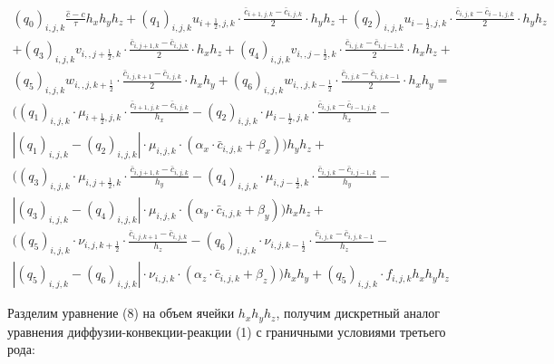 \documentclass[12pt]{article}
\begin{document}
\begin{multline} 
	(q_0)_{i,j,k}\frac{\hat{c}-c}{\tau}h_xh_yh_z + (q_1)_{i,j,k}u_{i+\frac{1}{2},j,k} \cdot\frac{\bar{c}_{i+1,j,k}-\bar{c}_{i,j,k}}{2}\cdot h_yh_z + (q_2)_{i,j,k}u_{i-\frac{1}{2},j,k}\cdot\frac{\bar{c}_{i,j,k}-\bar{c}_{i-1,j,k}}{2}\cdot h_yh_z \\
	+ (q_3)_{i,j,k}v_{i,,j+\frac{1}{2},k}\cdot\frac{\bar{c}_{i,j+1,k}-\bar{c}_{i,j,k}}{2}\cdot h_xh_z + 
	(q_4)_{i,j,k}v_{i,,j-\frac{1}{2},k}\cdot\frac{\bar{c}_{i,j,k}-\bar{c}_{i,j-1,k}}{2}\cdot h_xh_z + \\
	(q_5)_{i,j,k}w_{i,,j,k+\frac{1}{2}}\cdot\frac{\bar{c}_{i,j,k+1}-\bar{c}_{i,j,k}}{2}\cdot h_xh_y + 
	(q_6)_{i,j,k}w_{i,,j,k-\frac{1}{2}}\cdot\frac{\bar{c}_{i,j,k}-\bar{c}_{i,j,k-1}}{2}\cdot h_xh_y = \\
	((q_1)_{i,j,k}\cdot\mu_{i+\frac{1}{2},j,k}\cdot \frac{\bar{c}_{i+1,j,k}-\bar{c}_{i,j,k}}{h_x} -  (q_2)_{i,j,k}\cdot\mu_{i-\frac{1}{2},j,k}\cdot \frac{\bar{c}_{i,j,k}-\bar{c}_{i-1,j,k}}{h_x} - \\
	 |(q_1)_{i,j,k}-(q_2)_{i,j,k}|\cdot\mu_{i,j,k}\cdot(\alpha_x\cdot\bar{c}_{i,j,k}+\beta_x))h_yh_z + \\
	 ((q_3)_{i,j,k}\cdot\mu_{i,j+\frac{1}{2},k}\cdot \frac{\bar{c}_{i,j+1,k}-\bar{c}_{i,j,k}}{h_y} -  (q_4)_{i,j,k}\cdot\mu_{i,j-\frac{1}{2},k}\cdot \frac{\bar{c}_{i,j,k}-\bar{c}_{i,j-1,k}}{h_y} - \\
	 |(q_3)_{i,j,k}-(q_4)_{i,j,k}|\cdot\mu_{i,j,k}\cdot(\alpha_y\cdot\bar{c}_{i,j,k}+\beta_y))h_xh_z + \\
	 ((q_5)_{i,j,k}\cdot\nu_{i,j,k+\frac{1}{2}}\cdot \frac{\bar{c}_{i,j,k+1}-\bar{c}_{i,j,k}}{h_z} -  (q_6)_{i,j,k}\cdot\nu_{i,j,k-\frac{1}{2}}\cdot \frac{\bar{c}_{i,j,k}-\bar{c}_{i,j,k-1}}{h_z} - \\
	 |(q_5)_{i,j,k}-(q_6)_{i,j,k}|\cdot\nu_{i,j,k}\cdot(\alpha_z\cdot\bar{c}_{i,j,k}+\beta_z))h_xh_y + (q_5)_{i,j,k}\cdot f_{i,j,k}h_xh_yh_z
\end{multline} 

Разделим уравнение (8) на объем ячейки $h_xh_yh_z$, получим дискретный аналог уравнения диффузии-конвекции-реакции (1) с граничными условиями третьего рода:
\end{document}
